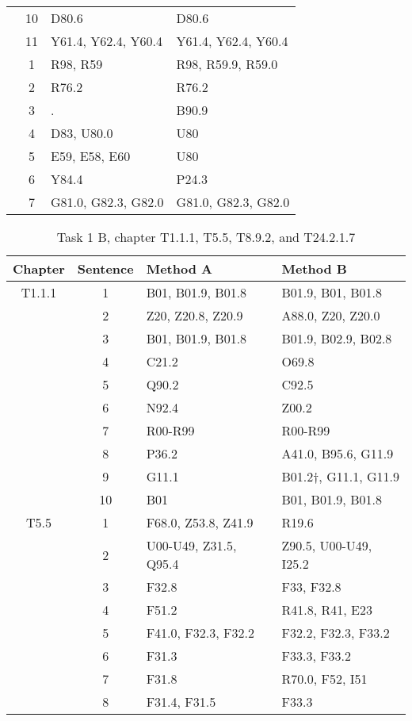 \begin{table}[htbp]
\begin{tabular}{c c l l}
	 & 10 & D80.6 & D80.6 \\
	 & 11 & Y61.4, Y62.4, Y60.4 & Y61.4, Y62.4, Y60.4 \\
	\addlinespace
	6 & 1 & R98, R59 & R98, R59.9, R59.0 \\
	 & 2 & R76.2 & R76.2 \\
	 & 3 & . & B90.9 \\
	 & 4 & D83, U80.0 & U80 \\
	 & 5 & E59, E58, E60 & U80 \\
	 & 6 & Y84.4 & P24.3 \\
	 & 7 & G81.0, G82.3, G82.0 & G81.0, G82.3, G82.0 \\
	\bottomrule
\end{tabular}
\end{table}

\begin{table}[htbp] \footnotesize \center
\caption{Task 1 B, chapter T1.1.1, T5.5, T8.9.2, and T24.2.1.7\label{tab:task1b}}
\begin{tabular}{c c l l}
    \toprule
    Chapter & Sentence & Method A & Method B \\
    \midrule
	T1.1.1 & 1 & B01, B01.9, B01.8 & B01.9, B01, B01.8 \\
	 & 2 & Z20, Z20.8, Z20.9 & A88.0, Z20, Z20.0 \\
	 & 3 & B01, B01.9, B01.8 & B01.9, B02.9, B02.8 \\
	 & 4 & C21.2 & O69.8 \\
	 & 5 & Q90.2 & C92.5 \\
	 & 6 & N92.4 & Z00.2 \\
	 & 7 & R00-R99 & R00-R99 \\
	 & 8 & P36.2 & A41.0, B95.6, G11.9 \\
	 & 9 & G11.1 & B01.2†, G11.1, G11.9 \\
	 & 10 & B01 & B01, B01.9, B01.8 \\
	\addlinespace
	T5.5 & 1 & F68.0, Z53.8, Z41.9 & R19.6 \\
	 & 2 & U00-U49, Z31.5, Q95.4 & Z90.5, U00-U49, I25.2 \\
	 & 3 & F32.8 & F33, F32.8 \\
	 & 4 & F51.2 & R41.8, R41, E23 \\
	 & 5 & F41.0, F32.3, F32.2 & F32.2, F32.3, F33.2 \\
	 & 6 & F31.3 & F33.3, F33.2 \\
	 & 7 & F31.8 & R70.0, F52, I51 \\
	 & 8 & F31.4, F31.5 & F33.3 \\

\end{tabular}
\end{table}
